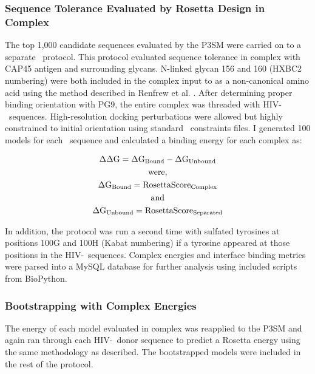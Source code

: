 \subsubsection{Sequence Tolerance Evaluated by Rosetta Design in Complex}
The top 1,000 candidate sequences evaluated by the P3SM were carried on to a separate \rosetta~protocol. This protocol evaluated sequence tolerance in complex with CAP45 antigen and surrounding glycans. N-linked glycan 156 and 160 (HXBC2 numbering) were both included in the complex input to \rosetta as a non-canonical amino acid using the method described in Renfrew et al. \citep{Renfrew:2012ci}. After determining proper binding orientation with PG9, the entire complex was threaded with HIV-\naive~sequences. High-resolution docking perturbations were allowed but highly constrained to initial orientation using standard \rosetta~constraints files. I generated 100 models for each \naive~sequence and calculated a binding energy for each complex as:

\begin{gather*}
    \Delta \Delta \textup{G} = \Delta \textup{G}_{\textup{Bound}} - \Delta \textup{G}_{\textup{Unbound}} \\
    \textup{were,} \\
    \Delta \textup{G}_{\textup{Bound}} = \textup{RosettaScore}_{\textup{Complex}} \\
    \textup{and}\\
    \Delta \textup{G}_{\textup{Unbound}} = \textup{RosettaScore}_{\textup{Separated}}
\end{gather*}

In addition, the protocol was run a second time with sulfated tyrosines at positions 100G and 100H (Kabat numbering) if a tyrosine appeared at those positions in the HIV-\naive~sequences. Complex energies and interface binding metrics were parsed into a MySQL database for further analysis using included scripts from BioPython.

\subsubsection{Bootstrapping with Complex Energies}
The energy of each model evaluated in complex was reapplied to the P3SM and again ran through each HIV-\naive~donor sequence to predict a Rosetta energy using the same methodology as described. The bootstrapped models were included in the rest of the protocol.

